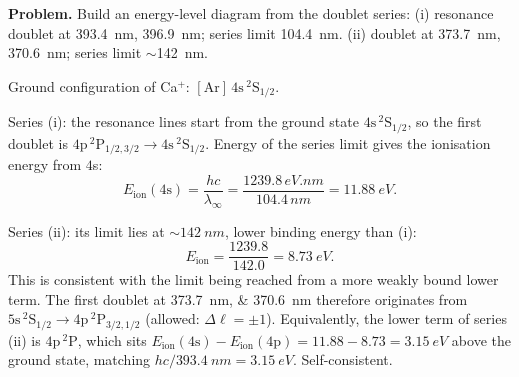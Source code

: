 \documentclass[11pt]{article}
\begin{document}
\textbf{Problem.} Build an energy-level diagram from the doublet series:
(i) resonance doublet at \SI{393.4}{nm}, \SI{396.9}{nm}; series limit \SI{104.4}{nm}.
(ii) doublet at \SI{373.7}{nm}, \SI{370.6}{nm}; series limit $\sim$\SI{142}{nm}.

Ground configuration of Ca$^{+}$: $[\mathrm{Ar}]\,4\mathrm{s}\,{}^{2}\!\mathrm{S}_{1/2}$.

Series (i): the resonance lines start from the ground state $4\mathrm{s}\,{}^{2}\!\mathrm{S}_{1/2}$, so the first doublet is $4\mathrm{p}\,{}^{2}\!\mathrm{P}_{1/2,3/2}\to 4\mathrm{s}\,{}^{2}\!\mathrm{S}_{1/2}$. Energy of the series limit gives the ionisation energy from $4$s:
\[
E_{\mathrm{ion}}(4\mathrm{s})=\frac{hc}{\lambda_{\infty}}=\frac{1239.8\,\si{eV.nm}}{104.4\,\si{nm}}=\SI{11.88}{eV}.
\]

Series (ii): its limit lies at $\sim\SI{142}{nm}$, lower binding energy than (i):
\[
E_{\mathrm{ion}}=\frac{1239.8}{142.0}=\SI{8.73}{eV}.
\]
This is consistent with the limit being reached from a more weakly bound lower term. The first doublet at \SIlist{373.7;370.6}{nm} therefore originates from $5\mathrm{s}\,{}^{2}\!\mathrm{S}_{1/2}\to 4\mathrm{p}\,{}^{2}\!\mathrm{P}_{3/2,1/2}$ (allowed: $\Delta\ell=\pm 1$). Equivalently, the lower term of series (ii) is $4\mathrm{p}\,{}^{2}\!\mathrm{P}$, which sits $E_{\mathrm{ion}}(4\mathrm{s})-E_{\mathrm{ion}}(4\mathrm{p})=11.88-8.73=\SI{3.15}{eV}$ above the ground state, matching $hc/\SI{393.4}{nm}=\SI{3.15}{eV}$. Self-consistent.
\end{document}
